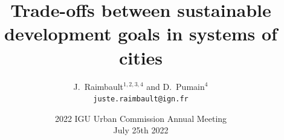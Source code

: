 \documentclass[english,11pt]{beamer}
\begin{document}
\title{Trade-offs between sustainable development goals in systems of cities}

\author{J.~Raimbault$^{1,2,3,4}$ and D.~Pumain$^4$\\
\texttt{juste.raimbault@ign.fr}
}





\date{2022 IGU Urban Commission Annual Meeting\\
July 25th 2022
}



\end{document}
